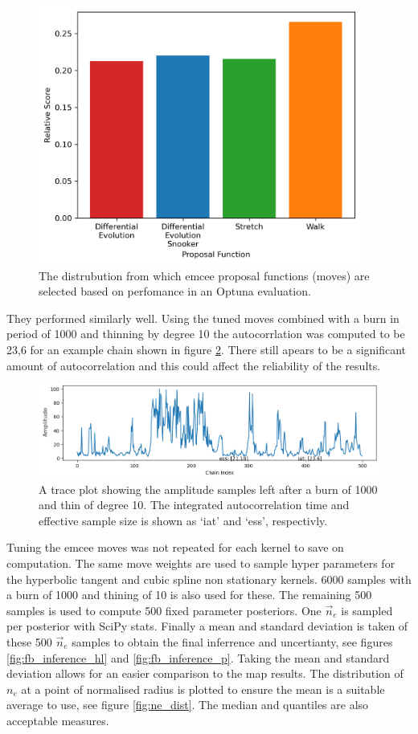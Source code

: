 \begin{figure}[ht]
    \centering
    \includegraphics[width=300pt]{images/Final/optuna.png}
    \caption{The distrubution from which emcee proposal functions (moves) are selected based on perfomance in an Optuna evaluation.}
    \label{fig:optuna}
\end{figure}

They performed similarly well. Using the tuned moves combined with a burn in period of 1000 and thinning by degree 10 the autocorrlation was computed to be 23,6 for an example chain shown in figure \ref{fig:tracethin}. There still apears to be a significant amount of autocorrelation and this could affect the reliability of the results.  

\begin{figure}[ht]
    \centering
    \includegraphics[width=\textwidth]{images/Final/TraceBurn1000_thin10.png}
    \caption{A trace plot showing the amplitude samples left after a burn of 1000 and thin of degree 10. The integrated autocorrelation time and effective sample size is shown as `iat' and `ess', respectivly.}
    \label{fig:tracethin}
\end{figure}

Tuning the emcee moves was not repeated for each kernel to save on computation. The same move weights are used to sample hyper parameters for the hyperbolic tangent and cubic spline non stationary kernels. 6000 samples with a burn of 1000 and thining of 10 is also used for these. The remaining 500 samples is used to compute 500 fixed parameter posteriors. One $\vec n_e$ is sampled per posterior with SciPy stats. Finally a mean and standard deviation is taken of these 500 $\vec n_e$ samples to obtain the final inferrence and uncertianty, see figures \ref{fig:fb_inference_hl} and \ref{fig:fb_inference_p}. Taking the mean and standard deviation allows for an easier comparison to the \gls{map} results. The distribution of $n_e$ at a point of normalised radius is plotted to ensure the mean is a suitable average to use, see figure \ref{fig:ne_dist}. The median and quantiles are also acceptable measures.

